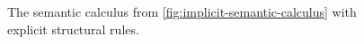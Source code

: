 \begin{figure}
\begin{mdframed}
    \vspace*{\baselineskip}
    \begin{pfbox}[0.9]
    \end{pfbox}
    \begin{pfbox}[0.9]
      \doubleLine{}
    \end{pfbox}
    \vspace*{\baselineskip}
  \end{mdframed}
  \caption{The semantic calculus from \autoref{fig:implicit-semantic-calculus}
    with explicit structural rules.}%
  \label{fig:explicit-semantic-calculus}
\end{figure}

